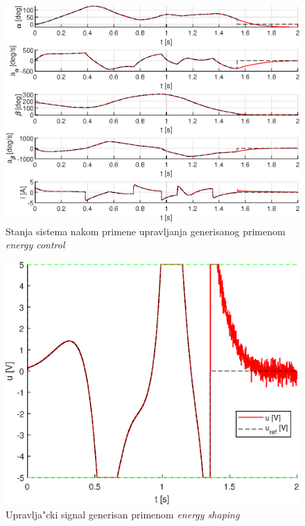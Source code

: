 \documentclass[a4paper,11pt]{article}
\theoremstyle{definition} \newtheorem{deff}{Definicija}[section]
\theoremstyle{definition} \newtheorem{prim}[deff]{Primer}
\theoremstyle{plain} \newtheorem{teor}[deff]{Teorema}
\begin{document}
	\begin{figure}[!h]
		\centering
		\includegraphics[width=.9\linewidth]{slike/States_EnergyControl_trajectory.eps}
		\caption{Stanja sistema nakom primene upravljanja generisanog primenom \emph{energy control}}
		\label{fig:traj_energycntrl}
	\end{figure}
	\clearpage
	
	\begin{figure}[!h]
		\centering
		\includegraphics[width=0.6\linewidth]{slike/Control_EnergyShaping_trajectory.eps}
		\caption{Upravlja"cki signal generisan primenom \emph{energy shaping}}
		\label{fig:cntrl_energysh}
	\end{figure}
	
\end{document}
